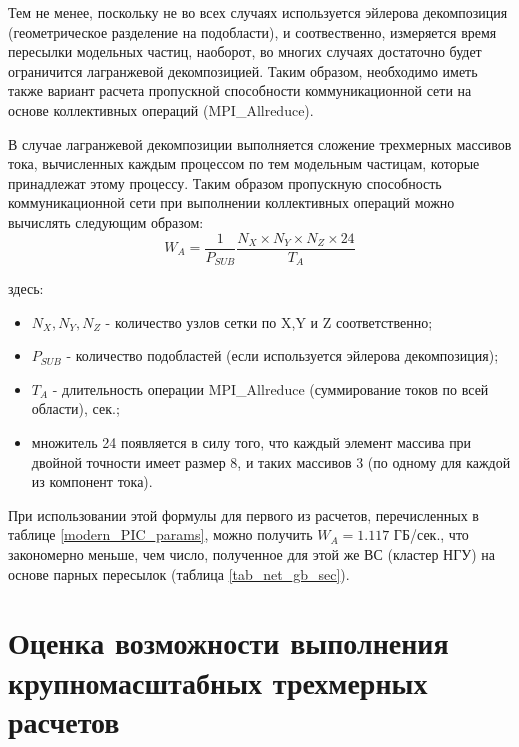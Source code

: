 \clearpage

Тем не менее, поскольку не во всех случаях используется эйлерова декомпозиция (геометрическое разделение на подобласти), и соотвественно, измеряется время пересылки модельных частиц, наоборот, во многих случаях достаточно будет ограничится лагранжевой декомпозицией. Таким образом, необходимо иметь также вариант расчета пропускной способности коммуникационной сети на основе коллективных операций (MPI\_Allreduce).

В случае лагранжевой декомпозиции выполняется сложение трехмерных массивов тока, вычисленных каждым процессом по тем модельным частицам, которые принадлежат этому процессу. Таким образом пропускную способность коммуникационной сети при выполнении коллективных операций можно вычислять следующим образом:
\begin{equation}
W_A = \frac{1}{P_{SUB}}\frac{N_X\times N_Y \times N_Z \times 24}{T_A}
\label{Net_performance_collective}
\end{equation}

здесь:
\begin{itemize}
	\item $N_X, N_Y, N_Z$ - количество узлов сетки по X,Y и Z соответственно;
	\item $P_{SUB}$ - количество подобластей (если используется эйлерова декомпозиция);
	\item $T_{A}$ - длительность операции MPI\_Allreduce (суммирование токов по всей области), сек.;
	\item множитель 24 появляется в силу того, что каждый элемент массива при двойной точности имеет размер 8, и таких массивов 3 (по одному для каждой из компонент тока).
\end{itemize}	

При использовании этой формулы для первого из расчетов, перечисленных в таблице \ref{modern_PIC_params}, можно получить 
$W_A = 1.117$ ГБ/сек., что закономерно меньше, чем число, полученное для этой же ВС (кластер НГУ) на основе парных пересылок
(таблица \ref{tab_net_gb_sec}).





%		
%		

\section{Оценка возможности выполнения крупномасштабных трехмерных расчетов}
\label{Big3D}

